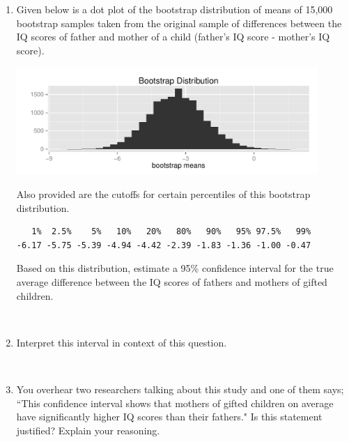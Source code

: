 \documentclass[11pt]{article}
\newcommand{\soln}[2]{$\:$\\ \vspace{#1}}{}
\begin{document}
\begin{enumerate}
\begin{enumerate}
\item Given below is a dot plot of the bootstrap distribution of means of 15,000 bootstrap samples taken 
from the original sample of differences between the IQ scores of father and mother of a child 
(father's IQ score - mother's IQ score). 
\begin{center}
\includegraphics[width=0.9\textwidth]{figures/gifted/iqdiff_boot_hist.pdf}
\end{center}
Also provided are the cutoffs for certain percentiles of this bootstrap distribution.
\begin{verbatim}
   1%  2.5%    5%   10%   20%   80%   90%   95% 97.5%   99% 
-6.17 -5.75 -5.39 -4.94 -4.42 -2.39 -1.83 -1.36 -1.00 -0.47
\end{verbatim}
Based on this distribution, estimate a 95\% confidence interval for the true average difference between the IQ scores 
of fathers and mothers of gifted children.

\soln{1cm}{(-5.75, -1.00)}

\item Interpret this interval in context of this question. 

\vfill

\soln{2cm}{We are 95\% confident that the average IQ scores of fathers of gifted children are 5.75 points to 1 point lower than 
their mothers' IQ scores.}



\pagebreak

\item You overhear two researchers talking about this study and one of them says; ``This confidence interval 
shows that mothers of gifted children on average have significantly higher IQ scores than their fathers." Is this statement 
justified? Explain your reasoning.

\soln{2cm}{Yes, the confidence interval doesn't include 0, and both bounds are negative, suggesting mothers of gifted 
children on average have significantly higher IQ scores than their fathers.}


\end{enumerate}
\end{enumerate}
\end{document}

